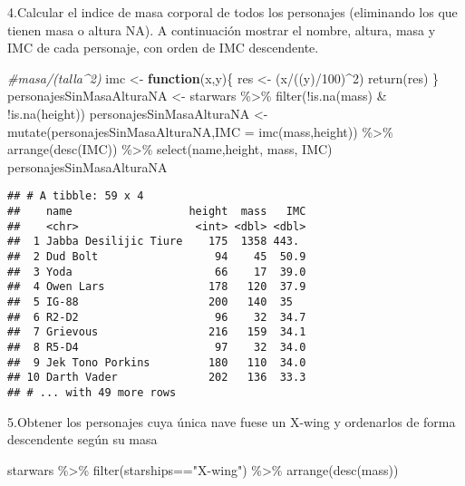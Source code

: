 \documentclass[
]{book}
\newenvironment{Shaded}{\begin{snugshade}}{\end{snugshade}}
\newcommand{\AttributeTok}[1]{\textcolor[rgb]{0.77,0.63,0.00}{#1}}
\newcommand{\CommentTok}[1]{\textcolor[rgb]{0.56,0.35,0.01}{\textit{#1}}}
\newcommand{\ControlFlowTok}[1]{\textcolor[rgb]{0.13,0.29,0.53}{\textbf{#1}}}
\newcommand{\DecValTok}[1]{\textcolor[rgb]{0.00,0.00,0.81}{#1}}
\newcommand{\FunctionTok}[1]{\textcolor[rgb]{0.00,0.00,0.00}{#1}}
\newcommand{\NormalTok}[1]{#1}
\newcommand{\OtherTok}[1]{\textcolor[rgb]{0.56,0.35,0.01}{#1}}
\newcommand{\SpecialCharTok}[1]{\textcolor[rgb]{0.00,0.00,0.00}{#1}}
\newcommand{\StringTok}[1]{\textcolor[rgb]{0.31,0.60,0.02}{#1}}
\begin{document}
4.Calcular el indice de masa corporal de todos los personajes (eliminando los que tienen masa o altura NA). A continuación mostrar el nombre, altura, masa y IMC de cada personaje, con orden de IMC descendente.

\begin{Shaded}
\begin{Highlighting}[]
\CommentTok{\#masa/(talla\^{}2)}
\NormalTok{imc }\OtherTok{\textless{}{-}} \ControlFlowTok{function}\NormalTok{(x,y)\{}
\NormalTok{  res }\OtherTok{\textless{}{-}}\NormalTok{ (x}\SpecialCharTok{/}\NormalTok{((y)}\SpecialCharTok{/}\DecValTok{100}\NormalTok{)}\SpecialCharTok{\^{}}\DecValTok{2}\NormalTok{)}
  \FunctionTok{return}\NormalTok{(res)}
\NormalTok{\}}
\NormalTok{personajesSinMasaAlturaNA }\OtherTok{\textless{}{-}}\NormalTok{ starwars }\SpecialCharTok{\%\textgreater{}\%} \FunctionTok{filter}\NormalTok{(}\SpecialCharTok{!}\FunctionTok{is.na}\NormalTok{(mass) }\SpecialCharTok{\&} \SpecialCharTok{!}\FunctionTok{is.na}\NormalTok{(height))}
\NormalTok{personajesSinMasaAlturaNA }\OtherTok{\textless{}{-}} \FunctionTok{mutate}\NormalTok{(personajesSinMasaAlturaNA,}\AttributeTok{IMC =} \FunctionTok{imc}\NormalTok{(mass,height)) }\SpecialCharTok{\%\textgreater{}\%} \FunctionTok{arrange}\NormalTok{(}\FunctionTok{desc}\NormalTok{(IMC)) }\SpecialCharTok{\%\textgreater{}\%} \FunctionTok{select}\NormalTok{(name,height, mass, IMC)}
\NormalTok{personajesSinMasaAlturaNA}
\end{Highlighting}
\end{Shaded}

\begin{verbatim}
## # A tibble: 59 x 4
##    name                  height  mass   IMC
##    <chr>                  <int> <dbl> <dbl>
##  1 Jabba Desilijic Tiure    175  1358 443. 
##  2 Dud Bolt                  94    45  50.9
##  3 Yoda                      66    17  39.0
##  4 Owen Lars                178   120  37.9
##  5 IG-88                    200   140  35  
##  6 R2-D2                     96    32  34.7
##  7 Grievous                 216   159  34.1
##  8 R5-D4                     97    32  34.0
##  9 Jek Tono Porkins         180   110  34.0
## 10 Darth Vader              202   136  33.3
## # ... with 49 more rows
\end{verbatim}

5.Obtener los personajes cuya única nave fuese un X-wing y ordenarlos de forma descendente según su masa

\begin{Shaded}
\begin{Highlighting}[]
\NormalTok{starwars }\SpecialCharTok{\%\textgreater{}\%} \FunctionTok{filter}\NormalTok{(starships}\SpecialCharTok{==}\StringTok{"X{-}wing"}\NormalTok{) }\SpecialCharTok{\%\textgreater{}\%} \FunctionTok{arrange}\NormalTok{(}\FunctionTok{desc}\NormalTok{(mass))}
\end{Highlighting}
\end{Shaded}
\end{document}
